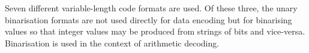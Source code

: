 Seven different variable-length code formats are used. Of these three,
the unary binarisation formats are not used directly for data encoding
but for binarising values so that integer values may be produced from
strings of bits and vice-versa. Binarisation is used in the context of
arithmetic decoding.

